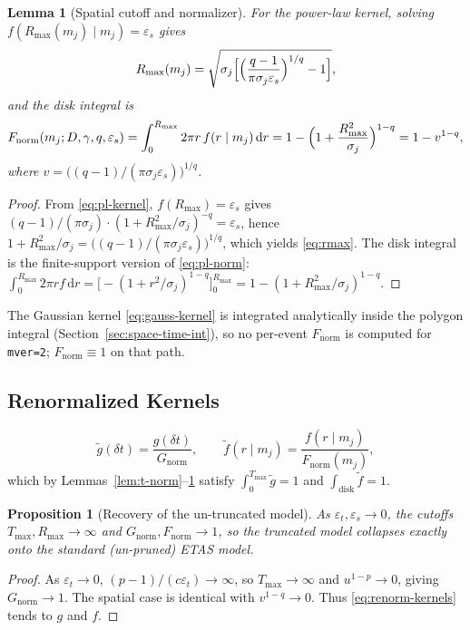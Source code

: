 \documentclass[11pt,a4paper]{article}
\theoremstyle{plain}
\newtheorem{proposition}{Proposition}
\newtheorem{lemma}{Lemma}
\theoremstyle{definition}
\newcommand{\dt}{\delta t}
\newcommand{\eps}{\varepsilon}
\newcommand{\Gnorm}{G_{\mathrm{norm}}}
\newcommand{\Fnorm}{F_{\mathrm{norm}}}
\newcommand{\Tmax}{T_{\max}}
\newcommand{\Rmax}{R_{\max}}
\newcommand{\sigj}{\sigma_j}
\newcommand{\dd}{\mathrm{d}}
\begin{document}
\begin{lemma}[Spatial cutoff and normalizer]\label{lem:s-norm}
For the power-law kernel, solving $f(\Rmax(m_j)\mid m_j)=\eps_s$ gives
\begin{equation}\label{eq:rmax}
\Rmax(m_j) = \sqrt{\sigj\Bigl[\Bigl(\frac{q-1}{\pi\sigj\eps_s}\Bigr)^{1/q}-1\Bigr]},
\end{equation}
and the disk integral is
\begin{equation}\label{eq:fnorm}
\Fnorm(m_j;D,\gamma,q,\eps_s) = \int_0^{\Rmax} 2\pi r\, f(r\mid m_j)\,\dd r
= 1-\Bigl(1+\frac{\Rmax^2}{\sigj}\Bigr)^{1-q} = 1-v^{1-q},
\end{equation}
where $v=\bigl((q-1)/(\pi\sigj\eps_s)\bigr)^{1/q}$.
\end{lemma}
\begin{proof}
From \eqref{eq:pl-kernel}, $f(\Rmax)=\eps_s$ gives
$(q-1)/(\pi\sigj)\cdot(1+\Rmax^2/\sigj)^{-q}=\eps_s$, hence
$1+\Rmax^2/\sigj=\bigl((q-1)/(\pi\sigj\eps_s)\bigr)^{1/q}$, which yields
\eqref{eq:rmax}. The disk integral is the finite-support version of
\eqref{eq:pl-norm}:
$\int_0^{\Rmax}2\pi r f\,\dd r
=\bigl[-(1+r^2/\sigj)^{1-q}\bigr]_0^{\Rmax}
=1-(1+\Rmax^2/\sigj)^{1-q}$.
\end{proof}

\begin{remark}\label{rem:gauss-no-fnorm}
The Gaussian kernel \eqref{eq:gauss-kernel} is integrated analytically inside
the polygon integral (Section~\ref{sec:space-time-int}), so no per-event
$\Fnorm$ is computed for \texttt{mver=2}; $\Fnorm\equiv 1$ on that path.
\end{remark}

\subsection{Renormalized Kernels}\label{sec:renorm-kernels}

\begin{equation}\label{eq:renorm-kernels}
\tilde g(\dt)=\frac{g(\dt)}{\Gnorm},\qquad
\tilde f(r\mid m_j)=\frac{f(r\mid m_j)}{\Fnorm(m_j)},
\end{equation}
which by Lemmas~\ref{lem:t-norm}--\ref{lem:s-norm} satisfy
$\int_0^{\Tmax}\tilde g=1$ and $\int_{\mathrm{disk}}\tilde f=1$.

\begin{proposition}[Recovery of the un-truncated model]\label{prop:limit}
As $\eps_t,\eps_s\to 0$, the cutoffs $\Tmax,\Rmax\to\infty$ and
$\Gnorm,\Fnorm\to 1$, so the truncated model collapses exactly onto the
standard (un-pruned) ETAS model.
\end{proposition}
\begin{proof}
As $\eps_t\to 0$, $(p-1)/(c\eps_t)\to\infty$, so $\Tmax\to\infty$ and
$u^{1-p}\to 0$, giving $\Gnorm\to 1$. The spatial case is identical with
$v^{1-q}\to 0$. Thus \eqref{eq:renorm-kernels} tends to $g$ and $f$.
\end{proof}
\end{document}
